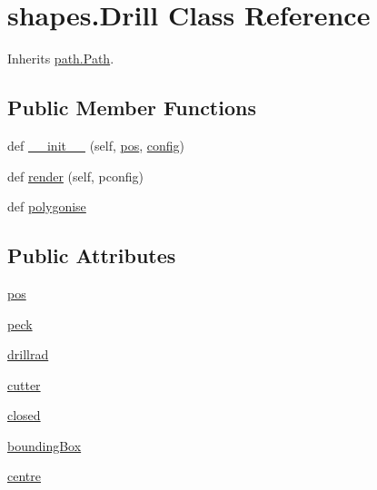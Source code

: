 \hypertarget{classshapes_1_1_drill}{}\section{shapes.\+Drill Class Reference}
\label{classshapes_1_1_drill}


Inherits \hyperlink{classpath_1_1_path}{path.\+Path}.

\subsection*{Public Member Functions}
\begin{DoxyCompactItemize}
\item 
def \hyperlink{classshapes_1_1_drill_a31e08b931225e8948dee628beebce281}{\+\_\+\+\_\+init\+\_\+\+\_\+} (self, \hyperlink{classshapes_1_1_drill_ade0cbf719eb083c1d709e8bd142ba09e}{pos}, \hyperlink{classpath_1_1_path_a889e352f02dba833077975ce855276ed}{config})
\item 
def \hyperlink{classshapes_1_1_drill_af985f3a90bcf4903994b87559b1493d0}{render} (self, pconfig)
\item 
def \hyperlink{classshapes_1_1_drill_a4ff07e6554822824b5b61a106fd4090d}{polygonise}
\end{DoxyCompactItemize}
\subsection*{Public Attributes}
\begin{DoxyCompactItemize}
\item 
\hyperlink{classshapes_1_1_drill_ade0cbf719eb083c1d709e8bd142ba09e}{pos}
\item 
\hyperlink{classshapes_1_1_drill_a514d5e174a3b7237d383669862b9158c}{peck}
\item 
\hyperlink{classshapes_1_1_drill_a5e03fef5821c6ec1ec92e82e7b7ba556}{drillrad}
\item 
\hyperlink{classshapes_1_1_drill_a1b98883ec07b24a8568e39debc93623a}{cutter}
\item 
\hyperlink{classshapes_1_1_drill_a2442fbb01a17112a5080d391a09b8480}{closed}
\item 
\hyperlink{classshapes_1_1_drill_af34520e09550d4058a672463230601c1}{bounding\+Box}
\item 
\hyperlink{classshapes_1_1_drill_a3525fe2393db318f023e19c270da785c}{centre}
\end{DoxyCompactItemize}
